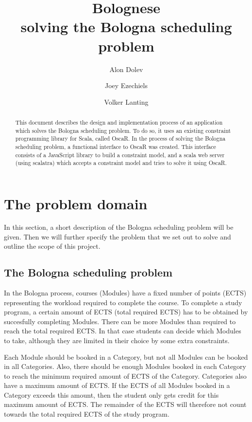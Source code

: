 \documentclass[a4paper]{article}
\title{Bolognese\\{\large solving the Bologna scheduling problem}}
\author{Alon Dolev \and Joey Ezechiels \and Volker Lanting}
\begin{document}
\maketitle
\begin{abstract}
This document describes the design and implementation process of an application which solves the Bologna scheduling problem.
To do so, it uses an existing constraint programming library for Scala, called OscaR.
In the process of solving the Bologna scheduling problem, a functional interface to OscaR was created.
This interface consists of a JavaScript library to build a constraint model, and a scala web server (using scalatra) which accepts a constraint model and tries to solve it using OscaR.
\end{abstract}

\newpage


\section{The problem domain}
In this section, a short description of the Bologna scheduling problem will be given.
Then we will further specify the problem that we set out to solve and outline the scope of this project.


\subsection{The Bologna scheduling problem}
In the Bologna process, courses (Modules) have a fixed number of points (ECTS) representing the workload required to complete the course.
To complete a study program, a certain amount of ECTS (total required ECTS) has to be obtained by succesfully completing Modules.
There can be more Modules than required to reach the total required ECTS.
In that case students can decide which Modules to take, although they are limited in their choice by some extra constraints.

Each Module should be booked in a Category, but not all Modules can be booked in all Categories.
Also, there should be enough Modules booked in each Category to reach the minimum required amount of ECTS of the Category.
Categories also have a maximum amount of ECTS.
If the ECTS of all Modules booked in a Category exceeds this amount, then the student only gets credit for this maximum amount of ECTS.
The remainder of the ECTS will therefore not count towards the total required ECTS of the study program.
\end{document}
